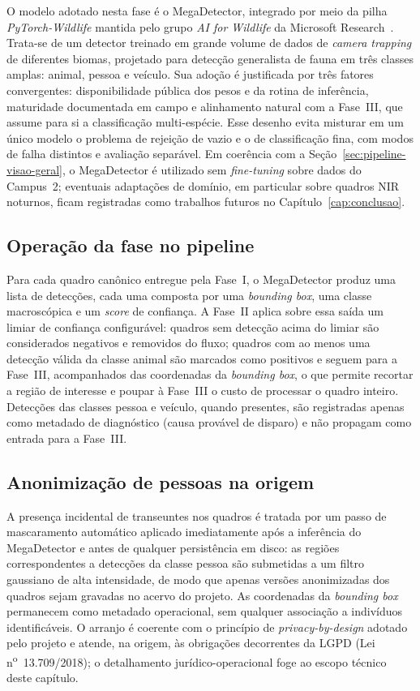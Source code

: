 O modelo adotado nesta fase é o MegaDetector, integrado por meio da pilha \textit{PyTorch-Wildlife} mantida pelo grupo \textit{AI for Wildlife} da Microsoft Research~\cite{hernandez2024pytorchwildlife,microsoft_cameratraps_repo}. Trata-se de um detector treinado em grande volume de dados de \textit{camera trapping} de diferentes biomas, projetado para detecção generalista de fauna em três classes amplas: animal, pessoa e veículo. Sua adoção é justificada por três fatores convergentes: disponibilidade pública dos pesos e da rotina de inferência, maturidade documentada em campo e alinhamento natural com a Fase~III, que assume para si a classificação multi-espécie. Esse desenho evita misturar em um único modelo o problema de rejeição de vazio e o de classificação fina, com modos de falha distintos e avaliação separável. Em coerência com a Seção~\ref{sec:pipeline-visao-geral}, o MegaDetector é utilizado sem \textit{fine-tuning} sobre dados do Campus~2; eventuais adaptações de domínio, em particular sobre quadros NIR noturnos, ficam registradas como trabalhos futuros no Capítulo~\ref{cap:conclusao}.

\subsection*{Operação da fase no pipeline}

Para cada quadro canônico entregue pela Fase~I, o MegaDetector produz uma lista de detecções, cada uma composta por uma \textit{bounding box}, uma classe macroscópica e um \textit{score} de confiança. A Fase~II aplica sobre essa saída um limiar de confiança configurável: quadros sem detecção acima do limiar são considerados negativos e removidos do fluxo; quadros com ao menos uma detecção válida da classe animal são marcados como positivos e seguem para a Fase~III, acompanhados das coordenadas da \textit{bounding box}, o que permite recortar a região de interesse e poupar à Fase~III o custo de processar o quadro inteiro. Detecções das classes pessoa e veículo, quando presentes, são registradas apenas como metadado de diagnóstico (causa provável de disparo) e não propagam como entrada para a Fase~III.

\subsection*{Anonimização de pessoas na origem}

A presença incidental de transeuntes nos quadros é tratada por um passo de mascaramento automático aplicado imediatamente após a inferência do MegaDetector e antes de qualquer persistência em disco: as regiões correspondentes a detecções da classe pessoa são submetidas a um filtro gaussiano de alta intensidade, de modo que apenas versões anonimizadas dos quadros sejam gravadas no acervo do projeto. As coordenadas da \textit{bounding box} permanecem como metadado operacional, sem qualquer associação a indivíduos identificáveis. O arranjo é coerente com o princípio de \textit{privacy-by-design} adotado pelo projeto e atende, na origem, às obrigações decorrentes da LGPD (Lei n\textsuperscript{o}~13.709/2018); o detalhamento jurídico-operacional foge ao escopo técnico deste capítulo.

